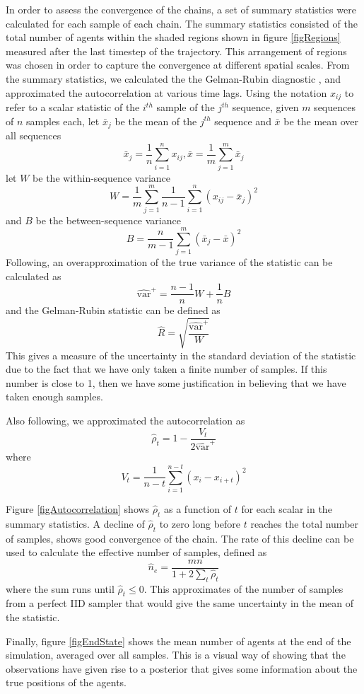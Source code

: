 \documentclass{article}
\begin{document}
In order to assess the convergence of the chains, a set of summary statistics were calculated for each sample of each chain. The summary statistics consisted of the total number of agents within the shaded regions shown in figure \ref{figRegions} measured after the last timestep of the trajectory. This arrangement of regions was chosen in order to capture the convergence at different spatial scales. From the summary statistics, we calculated the the Gelman-Rubin diagnostic \cite{gelman1992inference}, and approximated the autocorrelation at various time lags. Using the notation $x_{ij}$ to refer to a scalar statistic of the $i^{th}$ sample of the $j^{th}$ sequence, given $m$ sequences of $n$ samples each, let $\bar{x}_j$ be the mean of the $j^{th}$ sequence and $\bar{x}$ be the mean over all sequences
\[
\bar{x}_j = \frac{1}{n}\sum_{i=1}^n x_{ij}, \bar{x} = \frac{1}{m}\sum_{j=1}^m \bar{x}_j
\]
let $W$ be the within-sequence variance
\[
W = \frac{1}{m} \sum_{j=1}^m \frac{1}{n-1} \sum_{i=1}^n (x_{ij} - \bar{x}_j)^2
\]
and $B$ be the between-sequence variance
\[
B = \frac{n}{m-1}\sum_{j=1}^m (\bar{x}_j - \bar{x})^2
\]
Following\cite{gelman2013bayesian}, an overapproximation of the true variance of the statistic can be calculated as
\[
\widehat{\text{var}}^+ = \frac{n-1}{n}W + \frac{1}{n}B
\]
and the Gelman-Rubin statistic can be defined as
\[
\hat{R} = \sqrt{\frac{\widehat{\text{var}}^+}{W}}
\]
This gives a measure of the uncertainty in the standard deviation of the statistic due to the fact that we have only taken a finite number of samples. If this number is close to 1, then we have some justification in believing that we have taken enough samples.

Also following\cite{gelman2013bayesian}, we approximated the autocorrelation as
\[
\hat{\rho}_t = 1 - \frac{V_t}{2\widehat{\text{var}}^+}
\]
where
\[
V_t = \frac{1}{n-t} \sum_{i=1}^{n-t} (x_i - x_{i+t})^2
\]

Figure \ref{figAutocorrelation} shows $\hat{\rho}_t$ as a function of $t$ for each scalar in the summary statistics. A decline of $\hat{\rho}_t$ to zero long before $t$ reaches the total number of samples, shows good convergence of the chain. The rate of this decline can be used to calculate the effective number of samples, defined as
\[
\hat{n}_e = \frac{mn}{1 + 2\sum_{t} \hat{\rho}_t}
\]
where the sum runs until $\hat{\rho}_t \le 0$. This approximates of the number of samples from a perfect IID sampler that would give the same uncertainty in the mean of the statistic.

Finally, figure \ref{figEndState} shows the mean number of agents at the end of the simulation, averaged over all samples. This is a visual way of showing that the observations have given rise to a posterior that gives some information about the true positions of the agents.
\end{document}
